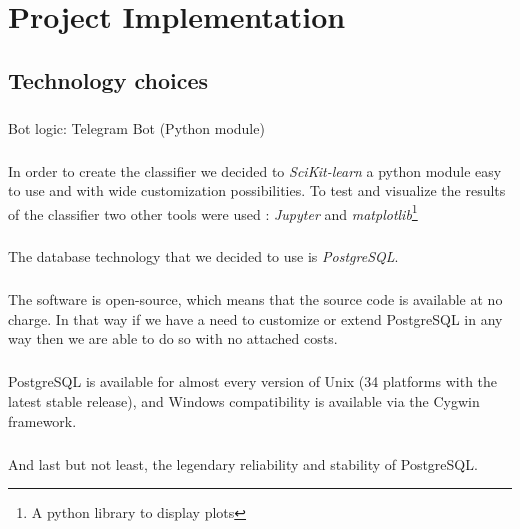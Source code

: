 \chapter{Project Implementation} 

\section{Technology choices}

\paragraph{}%
Bot logic: Telegram Bot (Python module) \\

\paragraph{}
In order to create the classifier we decided to \textit{SciKit-learn}\cite{bib:misc:2} a python module easy to use and with wide customization possibilities. To test and visualize the results of the classifier two other tools were used : \textit{Jupyter}\cite{bib:misc:3} and \textit{matplotlib}\footnote{A python library to display plots}

\paragraph{}
The database technology that we decided to use is \textit{PostgreSQL}\cite{bib:misc:1}.
\paragraph{}
The software is open-source, which means that the source code is available at no charge. In that way if we have a need to customize or extend PostgreSQL in any way then we are able to do so with no attached costs.
\paragraph{}
PostgreSQL is available for almost every version of Unix (34 platforms with the latest stable release), and Windows compatibility is available via the Cygwin framework.
\paragraph{}
And last but not least, the legendary reliability and stability of PostgreSQL.

